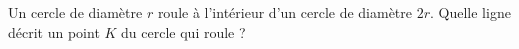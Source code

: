 Un cercle de diamètre $r$ roule à l'intérieur d'un cercle de diamètre $2r$. Quelle ligne décrit un point $K$ du cercle qui roule ?
